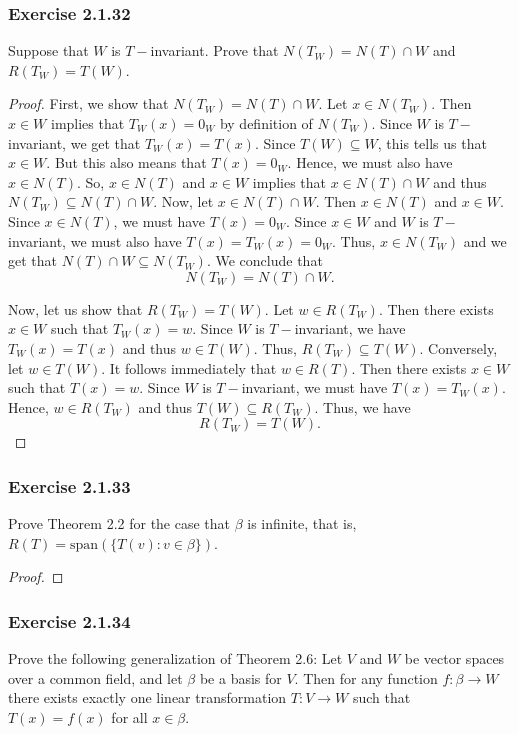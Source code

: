 \subsubsection{Exercise 2.1.32} Suppose that \( W  \) is \( T- \)invariant. Prove that \( N(T_{W}) = N(T) \cap W  \) and \( R(T_{W}) = T(W) \).
\begin{proof}
    First, we show that \( N(T_{W}) = N(T) \cap W  \). Let \( x \in N(T_{W}) \). Then \( x \in W  \) implies that \( T_{W}(x) = 0_{W}  \) by definition of \( N(T_{W}) \). Since \( W  \) is \( T- \)invariant, we get that \( T_{W}(x) = T(x)  \). Since \( T(W) \subseteq W  \), this tells us that \( x \in W  \). But this also means that \( T(x) = 0_{W}   \). Hence, we must also have \( x \in N(T)  \). So, \( x \in N(T) \) and \( x \in W  \) implies that \( x \in N(T) \cap W   \) and thus \( N(T_{W}) \subseteq N(T) \cap W  \). Now, let \( x \in N(T) \cap W  \). Then \( x \in N(T)  \) and \( x \in W  \). Since \( x \in N(T)  \),  we must have \( T(x) = 0_{W} \). Since \( x \in W  \) and \( W  \) is \( T- \)invariant, we must also have \( T(x) = T_{W}(x) = 0_{W} \). Thus, \( x \in N(T_{W}) \) and we get that \( N(T) \cap W \subseteq N(T_{W}) \). We conclude that
    \[ N(T_{W}) = N(T) \cap W.  \]


    Now, let us show that \( R(T_{W}) = T(W) \). Let \( w \in R(T_{W}) \). Then there exists \( x \in W  \) such that \( T_{W}(x) = w  \). Since \( W  \) is \( T- \)invariant, we have \( T_{W}(x) = T(x)  \) and thus \( w \in T(W) \). Thus, \( R(T_{W}) \subseteq T(W)  \). Conversely, let \( w \in T(W) \). It follows immediately that \( w \in R(T) \). Then there exists \( x \in W  \) such that \( T(x) = w  \). Since \( W  \) is \( T- \)invariant, we must have \( T(x) = T_{W}(x) \). Hence, \( w \in R(T_{W}) \) and thus \( T(W) \subseteq R(T_{W})  \). Thus, we have
    \[  R(T_{W}) = T(W). \]
\end{proof}

\subsubsection{Exercise 2.1.33} Prove Theorem 2.2 for the case that \( \beta  \) is infinite, that is, \( R(T) = \text{span}(\{ T(v) : v \in \beta  \} ) \).
\begin{proof}

\end{proof}

\subsubsection{Exercise 2.1.34} Prove the following generalization of Theorem 2.6: Let \( V  \) and \( W  \) be vector spaces over a common field, and let \( \beta  \) be a basis for \( V  \). Then for any function \( f: \beta \to W  \) there exists exactly one linear transformation \( T: V \to W  \) such that \( T(x) = f(x)  \) for all \( x \in \beta  \).

